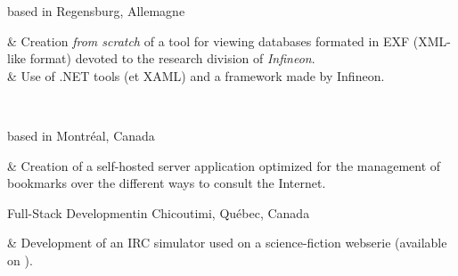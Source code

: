 	{ based in Regensburg, Allemagne}

\begin{cvstate}
	\begin{cvtable}{2.5ex}
		{\tiny {}} & Creation \textit{from scratch} of a tool for viewing databases formated in EXF (XML-like format) devoted to the research division of \textit{Infineon}.\\
		{\tiny {}} & Use of .NET tools (\csharp et XAML) and a framework made by Infineon.\\
	\end{cvtable}

	\\
\end{cvstate}


	{ based in Montréal, Canada}

\begin{cvstate}
	\begin{cvtable}{2.5ex}
		{\tiny {}} & Creation of a self-hosted server application optimized for the management of bookmarks over the different ways to consult the Internet.
	\end{cvtable}

\end{cvstate}

	{}{Full-Stack Development}{}{}{in Chicoutimi, Québec, Canada}

\begin{cvstate}
	\begin{cvtable}{2.5ex}
		{\tiny {}} & Development of an IRC simulator used on a science-fiction webserie (available on ).
	\end{cvtable}

\end{cvstate}
